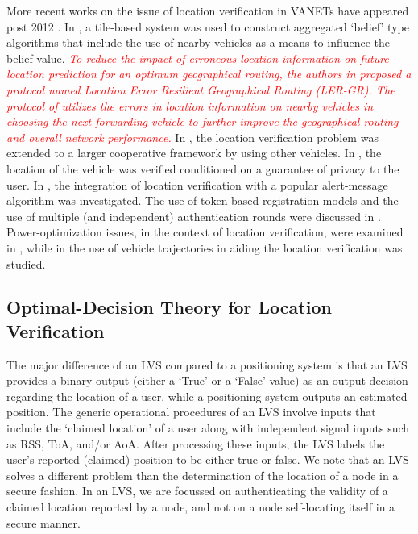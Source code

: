 \documentclass[journal]{IEEEtran}
\begin{document}
More recent works on the issue of location verification in VANETs have appeared post 2012 \cite{sheet2016location,kasana2017location,zhang2012cooperative,malandrino2013vip,jaballah2013secure,kim2017efficient,caparra2017optimization,vaas2018get}. In \cite{sheet2016location}, a tile-based system was used to construct aggregated `belief' type algorithms that include the use of nearby vehicles as a means to influence the belief value. \textcolor{red}{\textit{To reduce the impact of erroneous location information on future location prediction for an optimum geographical routing, the authors in \cite{kasana2017location} proposed a protocol named Location Error Resilient Geographical Routing (LER-GR). The protocol of \cite{kasana2017location} utilizes the errors in location information on nearby vehicles in choosing the next forwarding vehicle to further improve the geographical routing and overall network performance.}} In \cite{zhang2012cooperative}, the location verification problem was extended to a larger cooperative framework by using other vehicles. In \cite{malandrino2013vip}, the location of the vehicle was verified conditioned on a guarantee of privacy to the user. In \cite{jaballah2013secure}, the integration of location verification with a popular alert-message algorithm was investigated. The use of token-based registration models and the use of multiple (and independent) authentication rounds were
discussed in \cite{kim2017efficient}.  Power-optimization issues, in the context of location verification, were examined in \cite{caparra2017optimization}, while in \cite{vaas2018get} the use of vehicle trajectories in aiding the location verification was studied.

\subsection{Optimal-Decision Theory for Location Verification}
The major difference of an LVS compared to a positioning system is that an LVS provides a binary output (either a `True' or a `False' value) as an output decision regarding the location of a user, while a positioning system outputs an estimated position. The generic operational procedures of an LVS involve inputs that include the `claimed location' of a user along with independent signal inputs such as RSS, ToA, and/or AoA. After processing these inputs, the LVS labels the user's reported (claimed) position to be either true or false.
We note that an LVS solves a different problem than the determination of the location of a node in a secure fashion. In an LVS, we are focussed on authenticating the validity of a claimed location reported by a node, and not on a node self-locating itself in a secure manner.
\end{document}
